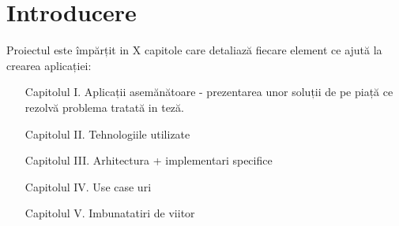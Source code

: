 \chapter*{Introducere} 
Proiectul este împărțit in X capitole care detaliază fiecare element ce ajută la crearea aplicației:

\begin{itemize}
	\item[Capitolul I.] Aplicații asemănătoare - prezentarea unor soluții de pe piață ce rezolvă problema tratată in teză.
	\item[Capitolul II.] Tehnologiile utilizate
	\item[Capitolul III.] Arhitectura + implementari specifice
	\item[Capitolul IV.] Use case uri
	\item[Capitolul V.]Imbunatatiri de viitor
\end{itemize}


